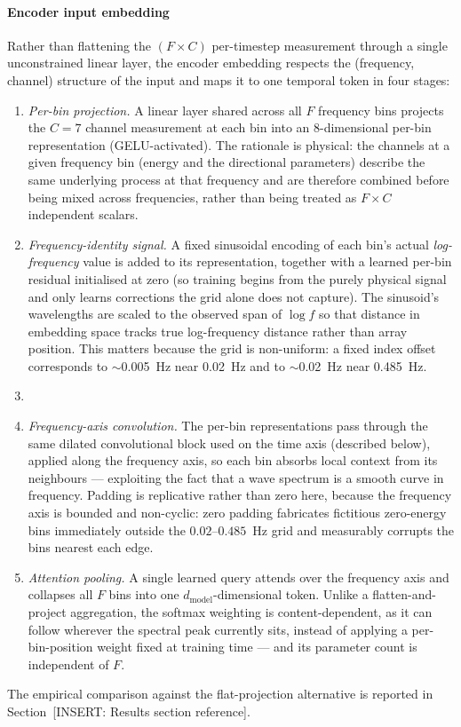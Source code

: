 \paragraph{Encoder input embedding}
Rather than flattening the $(F \times C)$ per-timestep measurement through a single unconstrained linear layer, the encoder embedding respects the (frequency, channel) structure of the input and maps it to one temporal token in four stages:
\begin{enumerate}
  \item \emph{Per-bin projection.} A linear layer shared across all $F$ frequency bins projects the $C=7$ channel measurement at each bin into an 8-dimensional per-bin representation (GELU-activated). The rationale is physical: the channels at a given frequency bin (energy and the directional parameters) describe the same underlying process at that frequency and are therefore combined before being mixed across frequencies, rather than being treated as $F \times C$ independent scalars.
  \item \emph{Frequency-identity signal.} A fixed sinusoidal encoding of each bin's actual \emph{log-frequency} value is added to its representation, together with a learned per-bin residual initialised at zero (so training begins from the purely physical signal and only learns corrections the grid alone does not capture). The sinusoid's wavelengths are scaled to the observed span of $\log f$ so that distance in embedding space tracks true log-frequency distance rather than array position. This matters because the grid is non-uniform: a fixed index offset corresponds to $\sim$0.005~Hz near 0.02~Hz and to $\sim$0.02~Hz near 0.485~Hz.
  \item 
  \item \emph{Frequency-axis convolution.} The per-bin representations pass through the same dilated convolutional block used on the time axis (described below), applied along the frequency axis, so each bin absorbs local context from its neighbours — exploiting the fact that a wave spectrum is a smooth curve in frequency. Padding is replicative rather than zero here, because the frequency axis is bounded and non-cyclic: zero padding fabricates fictitious zero-energy bins immediately outside the $0.02$--$0.485$~Hz grid and measurably corrupts the bins nearest each edge.
  \item \emph{Attention pooling.} A single learned query attends over the frequency axis and collapses all $F$ bins into one $d_{\text{model}}$-dimensional token. Unlike a flatten-and-project aggregation, the softmax weighting is content-dependent, as it can follow wherever the spectral peak currently sits, instead of applying a per-bin-position weight fixed at training time — and its parameter count is independent of $F$.
\end{enumerate}
The empirical comparison against the flat-projection alternative is reported in Section~[INSERT: Results section reference].

